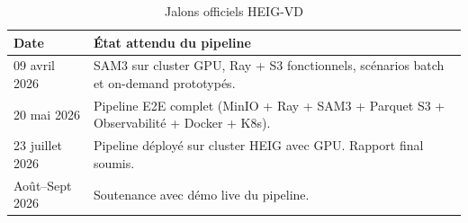 \begin{table}[H]
\centering
\begin{tabular}{|l|p{9cm}|}
\hline
\textbf{Date} & \textbf{État attendu du pipeline} \\
\hline
09 avril 2026 & SAM3 sur cluster GPU, Ray + S3 fonctionnels, scénarios batch et on-demand prototypés. \\
\hline
20 mai 2026   & Pipeline E2E complet (MinIO + Ray + SAM3 + Parquet S3 + Observabilité + Docker + K8s). \\
\hline
23 juillet 2026 & Pipeline déployé sur cluster HEIG avec GPU. Rapport final soumis. \\
\hline
Août--Sept 2026 & Soutenance avec démo live du pipeline. \\
\hline
\end{tabular}
\caption{Jalons officiels HEIG-VD}
\label{tab:jalons}
\end{table}
